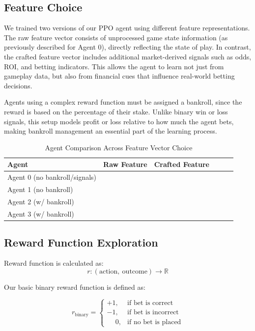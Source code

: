 \documentclass[sigconf]{acmart}
\newcommand{\cmark}{\ding{51}}
\begin{document}
\subsection{Feature Choice}

We trained two versions of our PPO agent using different feature representations. The raw feature vector consists of unprocessed game state information (as previously described for Agent 0), directly reflecting the state of play. In contrast, the crafted feature vector includes additional market-derived signals such as odds, ROI, and betting indicators. This allows the agent to learn not just from gameplay data, but also from financial cues that influence real-world betting decisions.

Agents using a complex reward function must be assigned a bankroll, since the reward is based on the percentage of their stake. Unlike binary win or loss signals, this setup models profit or loss relative to how much the agent bets, making bankroll management an essential part of the learning process.

\begin{table}[h]
  \caption{Agent Comparison Across Feature Vector Choice}
  \label{tab:agent_benchmarks}
  \begin{tabular}{lccccc}
    \toprule
    \textbf{Agent} & \textbf{Raw Feature} & \textbf{Crafted Feature} \\
    \midrule
    Agent 0 (no bankroll/signals)     & \cmark  &        \\
    Agent 1 (no bankroll)     & \cmark  &        \\
    Agent 2 (w/ bankroll)   &         & \cmark \\
    Agent 3 (w/ bankroll)   &         & \cmark \\
    \bottomrule
  \end{tabular}
\end{table}

\subsection{Reward Function Exploration}

Reward function is calculated as:
\[
r: (\text{action},\ \text{outcome}) \rightarrow \mathbb{R}
\]

Our basic binary reward function is defined as:

\begin{equation}
r_{\text{binary}} =
\begin{cases}
+1, & \text{if bet is correct} \\
-1, & \text{if bet is incorrect} \\
\phantom{+}0, & \text{if no bet is placed}
\end{cases}
\end{equation}
\end{document}
